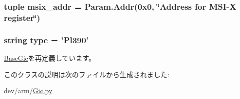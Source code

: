 \label{classGic_1_1Pl390_a139571be293d7ff174585fe7f804ef93}
\hypertarget{classGic_1_1Pl390_ae51f96a31147217db6f820197bb469aa}{
\subsubsection[{msix\_\-addr}]{\setlength{\rightskip}{0pt plus 5cm}tuple {\bf msix\_\-addr} = {\bf Param.Addr}(0x0, \char`\"{}Address for MSI-\/X register\char`\"{})}}
\label{classGic_1_1Pl390_ae51f96a31147217db6f820197bb469aa}
\hypertarget{classGic_1_1Pl390_acce15679d830831b0bbe8ebc2a60b2ca}{
\subsubsection[{type}]{\setlength{\rightskip}{0pt plus 5cm}string {\bf type} = '{\bf Pl390}'}}
\label{classGic_1_1Pl390_acce15679d830831b0bbe8ebc2a60b2ca}


\hyperlink{classGic_1_1BaseGic_acce15679d830831b0bbe8ebc2a60b2ca}{BaseGic}を再定義しています。

このクラスの説明は次のファイルから生成されました:\begin{DoxyCompactItemize}
\item 
dev/arm/\hyperlink{Gic_8py}{Gic.py}\end{DoxyCompactItemize}
